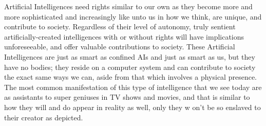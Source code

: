 Artificial Intelligences need rights similar to our own as they become more and more sophisticated and increasingly like unto us in how we think, are unique, and contribute to society. Regardless of their level of autonomy, truly sentient artificially-created intelligences with or without rights will have implications unforeseeable, and offer valuable contributions to society. These Artificial Intelligences are just as smart as confined AIs and just as smart as us, but they have no bodies; they reside on a computer system and can contribute to society the exact same ways we can, aside from that which involves a physical presence. The most common manifestation of this type of intelligence that we see today are as assistants to super geniuses in TV shows and movies, and that is similar to how they will and do appear in reality as well, only they w on't be so enslaved to their creator as depicted.